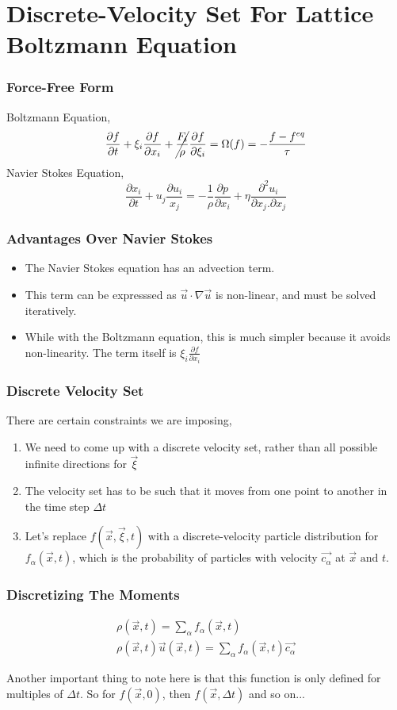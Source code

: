 \documentclass{beamer}
\begin{document}
\section{Discrete-Velocity Set For Lattice Boltzmann Equation}
\begin{frame}
	\frametitle{Force-Free Form}
	Boltzmann Equation,
	$$\frac{\partial f}{\partial t} + \xi_i \frac{\partial f}{\partial x_i} + \cancel{\frac{F_i}{\rho}}\frac{\partial f}{\partial \xi_i} = \Omega(f) = - \frac{f - f^{eq}}{\tau}$$
	Navier Stokes Equation,
	\[
	\frac{\partial x_i}{\partial t} + u_j \frac{\partial u_i}{x_j} = -\frac{1}{\rho} \frac{\partial p}{\partial x_i} + \eta \frac{\partial^2 u_i}{\partial x_j. \partial x_j}
\]

\end{frame}
\begin{frame}
	\frametitle{Advantages Over Navier Stokes}
	\begin{itemize}
		\item The Navier Stokes equation has an advection term.
		\item This term can be expresssed as $\vec{u} \cdot \nabla \vec{u}$ is non-linear, and must be solved iteratively.
		\item While with the Boltzmann equation, this is much simpler because it avoids non-linearity. The term itself is $\xi_i \frac{\partial f}{\partial x_i}$
	\end{itemize}
\end{frame}
\begin{frame}
	\frametitle{Discrete Velocity Set}
	There are certain constraints we are imposing,
	\begin{enumerate}
		\item We need to come up with a discrete velocity set, rather than all possible infinite directions for $\vec{\xi}$
		\item The velocity set has to be such that it moves from one point to another in the time step $\Delta t$
		\item Let's replace $f(\vec{x},\vec{\xi},t)$ with a discrete-velocity particle distribution for $f_\alpha (\vec{x},t)$, which is the probability of particles with velocity $\vec{c_\alpha}$ at $\vec{x} \text{ and } t$.
	\end{enumerate}
\end{frame}
\begin{frame}
\frametitle{Discretizing The Moments}
\begin{align*}
	\rho(\vec{x},t) = \sum_\alpha f_{\alpha} (\vec{x},t) \\
	\rho(\vec{x},t) \vec{u}(\vec{x},t) = \sum_\alpha f_\alpha(\vec{x},t) \vec{c_\alpha}
\end{align*}
\begin{fact}
	Another important thing to note here is that this function is only defined for multiples of $\Delta t$. So for $f(\vec{x},0)$, then $f(\vec{x},\Delta t)$ and so on...
\end{fact}
\end{frame}
\end{document}
